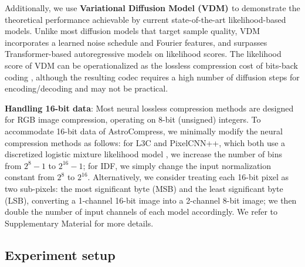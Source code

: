 Additionally, we use \textbf{Variational Diffusion Model (VDM) \citep{kingma2021variational}} to demonstrate the theoretical performance achievable by current state-of-the-art likelihood-based models. Unlike most diffusion models that target sample quality, VDM incorporates a learned noise schedule and Fourier features, and surpasses Transformer-based autoregressive models on likelihood scores. The likelihood score of VDM can be operationalized as the lossless compression cost of bits-back coding \citep{townsend2019practical, kingma2021variational}, although the resulting codec requires a high number of diffusion steps for encoding/decoding and may not be practical.

\textbf{Handling 16-bit data}: Most neural lossless compression methods are designed for RGB image compression, operating on 8-bit (unsigned) integers. 
To accommodate 16-bit data of AstroCompress, we minimally modify the neural compression methods as follows: for L3C and PixelCNN++, which both use a discretized logistic mixture likelihood model \citep{pixelcn}, we increase the number of bins from $2^8 -1$ to $2^{16}-1$; for IDF, we simply change the input normalization constant from $2^8$ to $2^{16}$. 
Alternatively, we consider treating each 16-bit pixel as two sub-pixels: the most significant byte (MSB) and the least significant byte (LSB), converting a 1-channel 16-bit image into a 2-channel 8-bit image; we then double the number of input channels of each model accordingly. We refer to Supplementary Material for more details.





\subsection{Experiment setup}
\label{sec:training}

